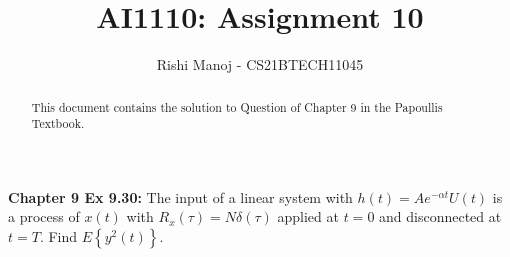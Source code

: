 \documentclass[journal,12pt,twocolumn]{IEEEtran}
\begin{document}
	
	
	\providecommand{\mbf}{\mathbf}
	\providecommand{\pr}[1]{\ensuremath{\Pr\left(#1\right)}}
	\providecommand{\qfunc}[1]{\ensuremath{Q\left(#1\right)}}
	\providecommand{\sbrak}[1]{\ensuremath{{}\left[#1\right]}}
	\providecommand{\lsbrak}[1]{\ensuremath{{}\left[#1\right.}}
	\providecommand{\rsbrak}[1]{\ensuremath{{}\left.#1\right]}}
	\providecommand{\brak}[1]{\ensuremath{\left(#1\right)}}
	\providecommand{\lbrak}[1]{\ensuremath{\left(#1\right.}}
	\providecommand{\rbrak}[1]{\ensuremath{\left.#1\right)}}
	\providecommand{\cbrak}[1]{\ensuremath{\left\{#1\right\}}}
	\providecommand{\lcbrak}[1]{\ensuremath{\left\{#1\right.}}
	\providecommand{\rcbrak}[1]{\ensuremath{\left.#1\right\}}}
	\providecommand{\dec}[2]{\ensuremath{\overset{#1}{\underset{#2}{\gtrless}}}}
	\newcommand{\myvec}[1]{\ensuremath{\begin{pmatrix}#1\end{pmatrix}}}
	\newcommand{\mydet}[1]{\ensuremath{\begin{vmatrix}#1\end{vmatrix}}}
	\newcommand*{\permcomb}[4][0mu]{{{}^{#3}\mkern#1#2_{#4}}}
	\newcommand*{\perm}[1][-3mu]{\permcomb[#1]{P}}
	\newcommand*{\comb}[1][-1mu]{\permcomb[#1]{C}}
		\title{
				AI1110: Assignment 10
		}
		\author{
			Rishi Manoj - CS21BTECH11045
		}
			
	\maketitle
	\begin{abstract}
		This document contains the solution to Question of Chapter 9 in the Papoullis Textbook.
	\end{abstract}
	
	\textbf{Chapter 9 Ex 9.30:}
	The input of a linear system with $h(t) = Ae^{-\alpha t}U(t)$ is a process of $x(t)$ with $R_x(\tau)=N\delta(\tau)$ applied at $t=0$ and disconnected at $t=T$. Find $E\cbrak{y^2(t)}$. 
	
\end{document}
